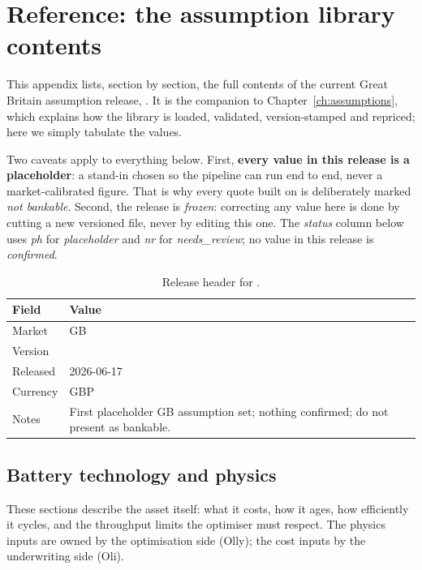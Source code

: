 \chapter{Reference: the assumption library contents}
\label{app:assumptions}

This appendix lists, section by section, the full contents of the current Great Britain assumption release, . It is the companion to Chapter~\ref{ch:assumptions}, which explains how the library is loaded, validated, version-stamped and repriced; here we simply tabulate the values.

Two caveats apply to everything below. First, \textbf{every value in this release is a placeholder}: a stand-in chosen so the pipeline can run end to end, never a market-calibrated figure. That is why every quote built on  is deliberately marked \emph{not bankable}. Second, the release is \emph{frozen}: correcting any value here is done by cutting a new versioned file, never by editing this one. The \emph{status} column below uses \emph{ph} for \emph{placeholder} and \emph{nr} for \emph{needs\_review}; no value in this release is \emph{confirmed}.

\begin{table}[H]
\centering
\caption{Release header for .}
\label{tab:b-header}
\small\sffamily
\begin{tabularx}{\textwidth}{@{}l L@{}}
\toprule
\textbf{Field} & \textbf{Value} \\
\midrule
Market & GB \\
Version &  \\
Released & 2026-06-17 \\
Currency & GBP \\
Notes & First placeholder GB assumption set; nothing confirmed; do not present as bankable. \\
\bottomrule
\end{tabularx}
\end{table}

\section{Battery technology and physics}

These sections describe the asset itself: what it costs, how it ages, how efficiently it cycles, and the throughput limits the optimiser must respect. The physics inputs are owned by the optimisation side (Olly); the cost inputs by the underwriting side (Oli).


